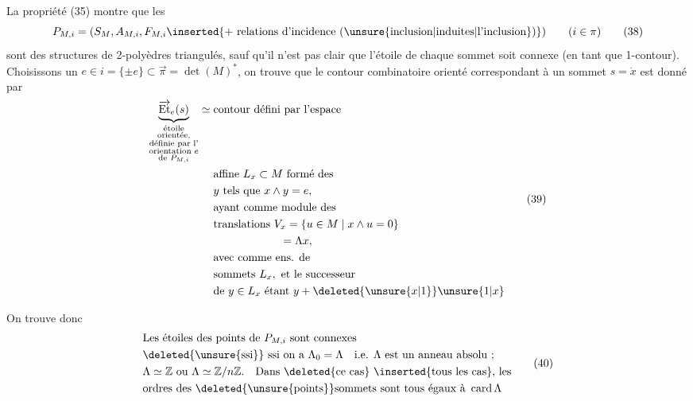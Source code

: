 La propriété (35) montre que les 
\[
P_{M,i}=(S_M,A_{M,i},F_{M,i}\inserted{+\text{ relations d'incidence (\unsure{inclusion|induites|l'inclusion})}})\qquad(i\in\pi)\tag*{(38)}
\]
sont des structures de 2-polyèdres triangulés, sauf qu'il n'est pas clair que l'étoile de chaque sommet soit connexe
(en tant que 1-contour). Choisissons
un $e\in i=\{\pm e\}\subset\overrightarrow\pi=\det(M)^*$, on
trouve que le contour combinatoire orienté
correspondant à un sommet $s=\dot x$ est
donné par
\[
\begin{aligned}
\underbrace{\overrightarrow{\mathrm{Et}}_e(s)}_{\substack{\text{étoile}\\\text{orientée,}\\\text{définie par l'}\\\text{orientation }e\\\text{de }P_{M,i}}}
\simeq{}&\text{contour défini par l'espace}\\
&\text{affine }L_x\subset M\ \text{formé des}\\
&y\text{ tels que }x\wedge y=e,\\
&\text{ayant comme module des}\\
&\text{translations }V_x=\{u\in M\mid x\wedge u=0\}\\
&\hspace{6em}=\Lambda x,\\
&\text{avec comme ens. de}\\
&\text{sommets }L_x,\ \text{et le successeur}\\
&\text{de }y\in L_x\text{ étant }y+\deleted{\unsure{x|1}}\unsure{1|x}
\end{aligned}\tag*{(39)}
\]

On trouve donc
\[
\begin{aligned}
&\text{Les étoiles des points de }P_{M,i}\text{ sont connexes}\\
&\deleted{\unsure{\text{ssi}}}\text{ ssi on a }\Lambda_0=\Lambda\quad\text{i.e. }\Lambda\text{ est un anneau absolu}\ ;\\
&\Lambda\simeq\mathbb Z\text{ ou }\Lambda\simeq\mathbb Z/n\mathbb Z.\quad\text{Dans \deleted{ce cas} \inserted{tous les cas}, les}\\
&\text{ordres des \deleted{\unsure{points}}sommets sont tous égaux à }\operatorname{card}\Lambda
\end{aligned}\tag*{(40)}
\]
